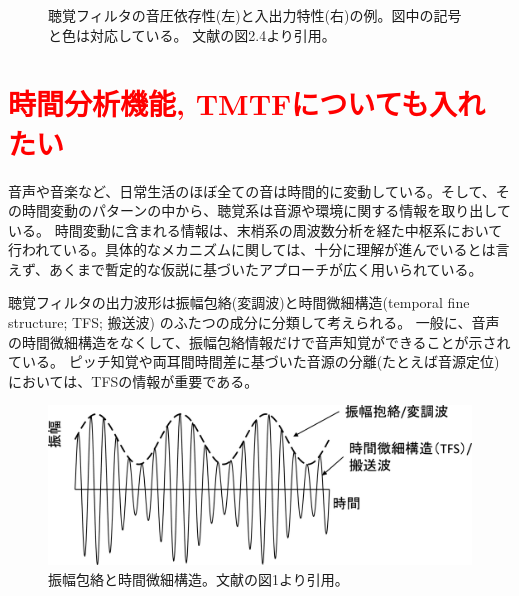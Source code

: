 \begin{figure}[h]
\begin{minipage}[t]{0.5\hsize}
        \label{fig:Basic_IOfunc}
    \end{minipage}
    \label{compression}
    \caption{聴覚フィルタの音圧依存性(左)と入出力特性(右)の例。図中の記号と色は対応している。
              文献\cite{yamamoto2023GESI}の図2.4より引用。}
\end{figure}

\newpage




\clearpage
\section{\textcolor{red}{時間分析機能, TMTFについても入れたい}}
音声や音楽など、日常生活のほぼ全ての音は時間的に変動している。そして、その時間変動のパターンの中から、聴覚系は音源や環境に関する情報を取り出している。
時間変動に含まれる情報は、末梢系の周波数分析を経た中枢系において行われている。具体的なメカニズムに関しては、十分に理解が進んでいるとは言えず、あくまで暫定的な仮説に基づいたアプローチが広く用いられている。

聴覚フィルタの出力波形は振幅包絡(変調波)と時間微細構造(temporal fine structure; TFS; 搬送波) のふたつの成分に分類して考えられる。
一般に、音声の時間微細構造をなくして、振幅包絡情報だけで音声知覚ができることが示されている。
ピッチ知覚や両耳間時間差に基づいた音源の分離(たとえば音源定位)においては、TFSの情報が重要である。

\begin{figure}[h]
    \vspace{40pt}
    \hspace{20pt}
    \centering
    \includegraphics[width=0.8\hsize]{Figure/RelatedResearch/furukawa2016time.eps}
    \caption{振幅包絡と時間微細構造。文献\cite{furukawa2016time}の図1より引用。}
\end{figure}

